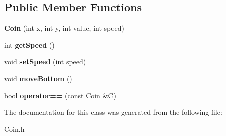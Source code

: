 \subsection*{Public Member Functions}
\begin{DoxyCompactItemize}
\item 
\mbox{\label{class_coin_a5e902f1d885451d7ccaee72737519473}} 
{\bfseries Coin} (int x, int y, int value, int speed)
\item 
\mbox{\label{class_coin_a223ac1d0cdf80c8eca9bd09edfc0edbc}} 
int {\bfseries get\+Speed} ()
\item 
\mbox{\label{class_coin_a0b367a3b902b5c2a4787706fa5a13972}} 
void {\bfseries set\+Speed} (int speed)
\item 
\mbox{\label{class_coin_a644f624bd7da3210cb040f3bdb87b226}} 
void {\bfseries move\+Bottom} ()
\item 
\mbox{\label{class_coin_ae12c00f84a81afbb7edb2aa3b9842683}} 
bool {\bfseries operator==} (const \mbox{\hyperlink{class_coin}{Coin}} \&C)
\end{DoxyCompactItemize}


The documentation for this class was generated from the following file\+:\begin{DoxyCompactItemize}
\item 
Coin.\+h\end{DoxyCompactItemize}
